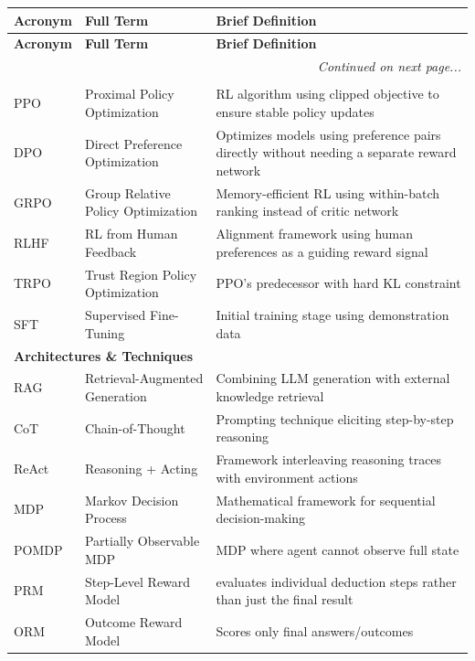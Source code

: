 \documentclass[12pt,a4paper]{report}
\theoremstyle{definition}
\begin{document}
\begin{longtable}{@{}p{2.5cm}p{5cm}p{7cm}@{}}
\toprule
\textbf{Acronym} & \textbf{Full Term} & \textbf{Brief Definition} \\
\midrule
\endfirsthead
\toprule
\textbf{Acronym} & \textbf{Full Term} & \textbf{Brief Definition} \\
\midrule
\endhead
\midrule
\multicolumn{3}{r}{\textit{Continued on next page...}} \\
\endfoot
\bottomrule
\endlastfoot

\multicolumn{3}{l}{\textbf{Core Algorithms}} \\
\midrule
PPO & Proximal Policy Optimization & RL algorithm using clipped objective to ensure stable policy updates \\
DPO & Direct Preference Optimization & Optimizes models using preference pairs directly without needing a separate reward network
 \\
GRPO & Group Relative Policy Optimization & Memory-efficient RL using within-batch ranking instead of critic network \\
RLHF & RL from Human Feedback & Alignment framework using human preferences as a guiding reward signal
 \\
TRPO & Trust Region Policy Optimization & PPO's predecessor with hard KL constraint \\
SFT & Supervised Fine-Tuning & Initial training stage using demonstration data \\
\midrule

\multicolumn{3}{l}{\textbf{Architectures \& Techniques}} \\
\midrule
RAG & Retrieval-Augmented Generation & Combining LLM generation with external knowledge retrieval \\
CoT & Chain-of-Thought & Prompting technique eliciting step-by-step reasoning \\
ReAct & Reasoning + Acting & Framework interleaving reasoning traces with environment actions \\
MDP & Markov Decision Process & Mathematical framework for sequential decision-making \\
POMDP & Partially Observable MDP & MDP where agent cannot observe full state \\
PRM & Step-Level Reward Model & evaluates individual deduction steps rather than just the final result \\
ORM & Outcome Reward Model & Scores only final answers/outcomes \\
\midrule


\end{longtable}
\end{document}
